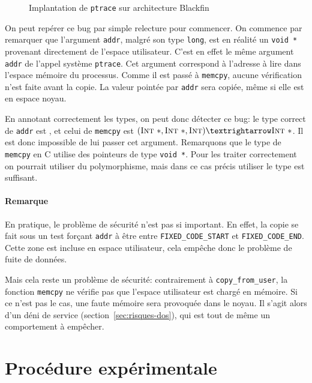 \begin{figure}
    \caption{Implantation de \texttt{ptrace} sur architecture Blackfin}
    \label{fig:ptrace-blackfin}
\end{figure}

On peut repérer ce bug par simple relecture pour commencer. On commence par
remarquer que l'argument \texttt{addr}, malgré son type \texttt{long}, est en
réalité un \texttt{void *} provenant directement de l'espace utilisateur. C'est
en effet le même argument \texttt{addr} de l'appel système \texttt{ptrace}.
Cet argument correspond à l'adresse à lire dans l'espace mémoire du processus.
Comme il est passé à \texttt{memcpy}, aucune vérification n'est faite avant la
copie. La valeur pointée par \texttt{addr} sera copiée, même si elle est en
espace noyau.

En annotant correctement les types, on peut donc détecter ce bug: le type
correct de \texttt{addr} est \ptrU{\tInt}, et celui de \texttt{memcpy} est
$(\ptrK{\tInt}, \ptrK{\tInt}, \tInt) → \ptrK{\tInt}$. Il est donc impossible de
lui passer cet argument. Remarquons que le type de \texttt{memcpy} en C utilise
des pointeurs de type \texttt{void *}. Pour les traiter correctement on pourrait
utiliser du polymorphisme, mais dans ce cas précis utiliser le type \ptrK{\tInt}
est suffisant.

\paragraph{Remarque}

En pratique, le problème de sécurité n'est pas si important. En effet,
la copie se fait sous un test forçant \texttt{addr} à être entre
\nolinkurl{FIXED\_CODE\_START} et \texttt{FIXED\_CODE\_END}. Cette zone est
incluse en espace utilisateur, cela empêche donc le problème de fuite de
données.

Mais cela reste un problème de sécurité: contrairement à
\texttt{copy\_from\_user}, la fonction \texttt{memcpy} ne vérifie pas que
l'espace utilisateur est chargé en mémoire. Si ce n'est pas le cas, une faute
mémoire sera provoquée dans le noyau. Il s'agit alors d'un déni de service
(section~\ref{sec:risques-dos}), qui est tout de même un comportement à
empêcher.

\section{Procédure expérimentale}
\label{sec:demo-unif}

